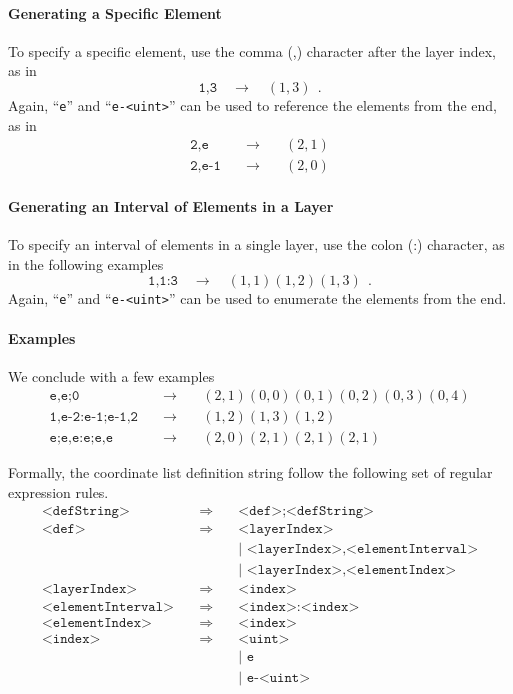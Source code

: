 \paragraph{Generating a Specific Element}
To specify a specific element, use the comma (,) character after the
layer index, as in
%
$$
\texttt{1,3} \quad\rightarrow\quad (1,3)~~.
$$ 
%
Again, ``{\tt e}'' and ``{\tt e-<uint>}'' can be used to reference
the elements from the end, as in 
\begin{eqnarray*} 
\texttt{2,e}&\quad\rightarrow\quad&(2,1)\\
\texttt{2,e-1}&\quad\rightarrow\quad&(2,0)
\end{eqnarray*} 

\paragraph{Generating an Interval of Elements in a Layer}
To specify an interval of elements in a single layer, use the colon
(:) character, as in the following examples
%
$$
\texttt{1,1:3} \quad\rightarrow\quad (1,1) (1,2) (1,3)~~.
$$ 
%
Again, ``{\tt e}'' and ``{\tt e-<uint>}'' can be used to enumerate the
elements from the end. 

\paragraph{Examples}
We conclude with a few examples
\begin{eqnarray*} 
\texttt{e,e;0}&\quad\rightarrow\quad&(2,1)(0,0)(0,1)(0,2)(0,3)(0,4) \\
\texttt{1,e-2:e-1;e-1,2}&\quad\rightarrow\quad&(1,2)(1,3)(1,2) \\
\texttt{e;e,e:e;e,e}&\quad\rightarrow\quad&(2,0)(2,1)(2,1)(2,1)
\end{eqnarray*} 



Formally, the coordinate list definition string follow the
following set of regular expression rules.
\begin{eqnarray*}
\texttt{<defString>} &\quad\Rightarrow\quad& \texttt{<def>;<defString>}\\
\texttt{<def>} &\quad\Rightarrow\quad& \texttt{<layerIndex>}\\
&&\texttt{| <layerIndex>,<elementInterval>}\\
&&\texttt{| <layerIndex>,<elementIndex>}\\
\texttt{<layerIndex>} &\quad\Rightarrow\quad& \texttt{<index>}\\
\texttt{<elementInterval>} &\quad\Rightarrow\quad& \texttt{<index>:<index>}\\
\texttt{<elementIndex>} &\quad\Rightarrow\quad& \texttt{<index>}\\
\texttt{<index>} &\quad\Rightarrow\quad& \texttt{<uint>}\\
&&\texttt{| e}\\
&&\texttt{| e-<uint>}
\end{eqnarray*}
